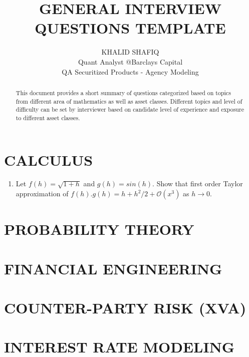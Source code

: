 \documentclass[a4paper]{article}
\title{GENERAL INTERVIEW QUESTIONS TEMPLATE}
\author{KHALID SHAFIQ  \\
        \small Quant Analyst @Barclays Capital \\
        \small QA Securitized Products - Agency Modeling \\
}
\date{} %
\begin{document}
\maketitle

\begin{abstract}
This document provides a short summary of questions categorized based on topics from different area of mathematics as well as asset classes. Different topics and level of difficulty can be set by interviewer based on candidate level of experience and exposure to different asset classes. 
\end{abstract} \hspace{10pt}
     
\section*{CALCULUS}
\begin{enumerate}
\item Let $f(h) = \sqrt{1+h}$ and $g(h) = sin(h)$. Show that first order Taylor approximation of
$f(h).g(h) = h + h^2/2 + \mathcal{O}(x^3)$ as $h \to 0$.
\end{enumerate}

 
\section*{PROBABILITY THEORY}
\begin{enumerate}
\end{enumerate}

\section*{FINANCIAL ENGINEERING}
\begin{enumerate}
\end{enumerate}


\section*{COUNTER-PARTY RISK (XVA)}
\begin{enumerate}
\end{enumerate}

\section*{INTEREST RATE MODELING}
\begin{enumerate}
\end{enumerate}
\end{document}
